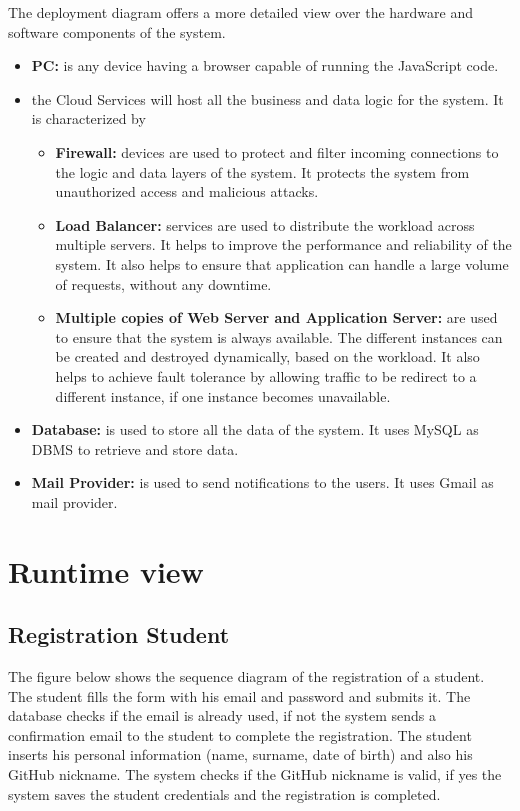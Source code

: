 The deployment diagram offers a more detailed view over the hardware and software components of the system. 
\begin{itemize}
    \item  \textbf{PC: }is any device having a browser capable of running the JavaScript code.
    \item   the Cloud Services will host all the business and data logic for the system. It is characterized by 
    \begin{itemize}
        \item  \textbf{Firewall:} devices are used to protect and filter incoming connections to the logic and data layers of the system. It protects the system from unauthorized access and malicious attacks.
        \item  \textbf{Load Balancer:} services are used to distribute the workload across multiple servers. It helps to improve the performance and reliability of the system. It also helps to ensure that application can handle a large volume of requests, without any downtime.
        \item  \textbf{Multiple copies of Web Server and Application Server:} are used to ensure that the system is always available. The different instances can be created and destroyed dynamically, based on the workload. It also helps to achieve fault tolerance by allowing traffic to be redirect to a different instance, if one instance becomes unavailable.
    \end{itemize}
    \item   \textbf{Database:} is used to store all the data of the system. It uses MySQL as DBMS to retrieve and store data.
    \item   \textbf{Mail Provider: }is used to send notifications to the users. It uses Gmail as mail provider.
\end{itemize}

\section{Runtime view}
\subsection{Registration Student}
The figure below shows the sequence diagram of the registration of a student. The student fills the form with his email and password and submits it. 
The database checks if the email is already used, if not the system sends a confirmation email to the student to complete the registration. 
The student inserts his personal information (name, surname, date of birth) and also his GitHub nickname. 
The system checks if the GitHub nickname is valid, if yes the system saves the student credentials and the registration is completed.


